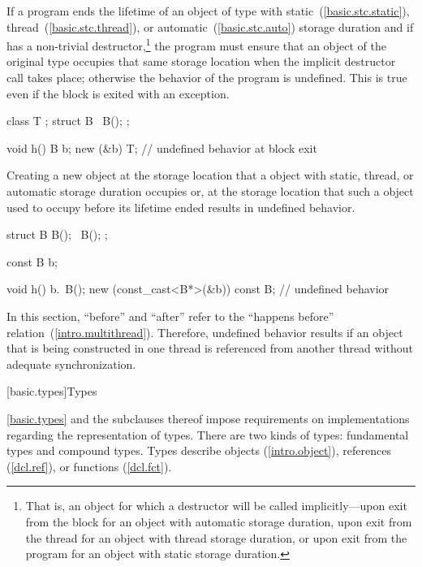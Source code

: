 \pnum
If a program ends the lifetime of an object of type  with
static~(\ref{basic.stc.static}), thread~(\ref{basic.stc.thread}),
or automatic~(\ref{basic.stc.auto})
storage duration and if  has a non-trivial destructor,\footnote{That
is, an object for which a destructor will be called
implicitly---upon exit from the block for an object with
automatic storage duration, upon exit from the thread for an object with
thread storage duration, or upon exit from the program for an object
with static storage duration.}
the program must ensure that an object of the original type occupies
that same storage location when the implicit destructor call takes
place; otherwise the behavior of the program is undefined. This is true
even if the block is exited with an exception. \enterexample

\begin{codeblock}
class T { };
struct B {
   ~B();
};

void h() {
   B b;
   new (&b) T;
}                               // undefined behavior at block exit
\end{codeblock}
\exitexample 

\pnum
Creating a new object at the storage location that a 
object with static, thread, or automatic storage duration occupies or, at the
storage location that such a  object used to occupy before
its lifetime ended results in undefined behavior. \enterexample

\begin{codeblock}
struct B {
  B();
  ~B();
};

const B b;

void h() {
  b.~B();
  new (const_cast<B*>(&b)) const B;             // undefined behavior
}
\end{codeblock}
\exitexample 

\pnum
In this section, ``before'' and ``after'' refer to the ``happens before''
relation~(\ref{intro.multithread}). \enternote Therefore, undefined behavior results
if an object that is being constructed in one thread is referenced from another
thread without adequate synchronization. \exitnote%

[basic.types]{Types}%

\pnum
\enternote
\ref{basic.types} and the subclauses thereof
impose requirements on implementations regarding the representation
of types.
There are two kinds of types: fundamental types and compound types.
Types describe objects (\ref{intro.object}),
references (\ref{dcl.ref}),
or functions (\ref{dcl.fct}).
\exitnote

